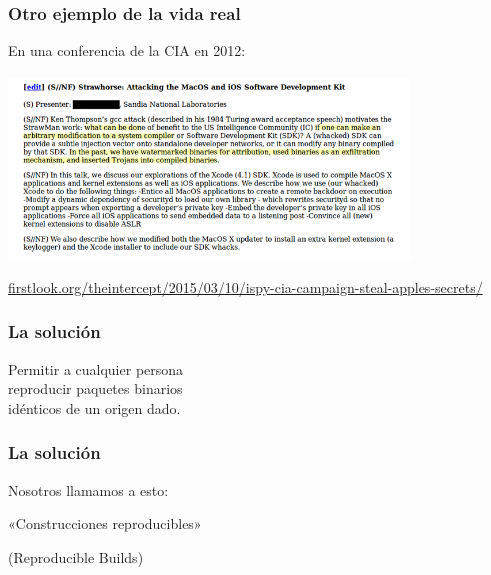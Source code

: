 \documentclass[14pt,aspectratio=169]{beamer}
\begin{document}
\begin{frame}[fragile]
\frametitle{Otro ejemplo de la vida real}

En una conferencia de la CIA en 2012:

\begin{center}
\includegraphics[width=0.8\textwidth]{images/strawhorse.png}

{\footnotesize 
\url{firstlook.org/theintercept/2015/03/10/ispy-cia-campaign-steal-apples-secrets/}
}
\end{center}

\end{frame}

\begin{frame}
\frametitle{La solución}

\begin{center}
\Large
Permitir a cualquier persona\\
reproducir paquetes binarios\\
idénticos de un origen dado.
\end{center}

\end{frame}

\begin{frame}
\frametitle{La solución}

\begin{center}
Nosotros llamamos a esto:

\huge
«Construcciones reproducibles»
\begin{LARGE}
(Reproducible Builds)
\end{LARGE}
\end{center}

\end{frame}
\end{document}

